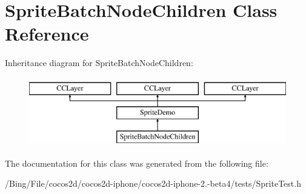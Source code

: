 \hypertarget{interface_sprite_batch_node_children}{\section{Sprite\-Batch\-Node\-Children Class Reference}
\label{interface_sprite_batch_node_children}
}
Inheritance diagram for Sprite\-Batch\-Node\-Children\-:\begin{figure}[H]
\begin{center}
\leavevmode
\includegraphics[height=3.000000cm]{interface_sprite_batch_node_children}
\end{center}
\end{figure}


The documentation for this class was generated from the following file\-:\begin{DoxyCompactItemize}
\item 
/\-Bing/\-File/cocos2d/cocos2d-\/iphone/cocos2d-\/iphone-\/2.-\/beta4/tests/Sprite\-Test.\-h\end{DoxyCompactItemize}
